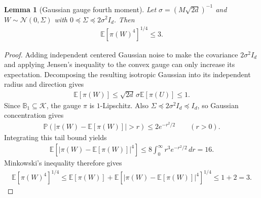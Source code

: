 \documentclass{article}
\newtheorem{lemma}[lemma]{Lemma}
\newcommand{\E}{\mathbb E}
\newcommand{\Pp}{\mathbb P}
\newcommand{\K}{\mathcal K}
\newcommand{\N}{\mathcal N}
\newcommand{\1}{\mathbf 1}
\begin{document}
\begin{lemma}[Gaussian gauge fourth moment]
    \label{lem:gaussian-gauge-fourth-moment}
    Let $\sigma=(M\sqrt{2d})^{-1}$ and $W\sim\N(0,\Sigma)$ with
    $0\preceq\Sigma\preceq2\sigma^2I_d$. Then
    \begin{align}
        \E[\pi(W)^4]^{1/4}\leq3.
    \end{align}
\end{lemma}
\begin{proof}
    Adding independent centered Gaussian noise to make the covariance
    $2\sigma^2I_d$ and applying Jensen's inequality to the convex gauge
    can only increase its expectation. Decomposing the resulting
    isotropic Gaussian into its independent radius and direction gives
    \begin{align}
        \E[\pi(W)]
        \leq\sqrt{2d}\,\sigma\E[\pi(U)]\leq1.
    \end{align}
    Since $\mathbb B_1\subseteq\K$, the gauge $\pi$ is $1$-Lipschitz.
    Also $\Sigma\preceq2\sigma^2I_d\preceq I_d$, so Gaussian
    concentration gives
    \begin{align}
        \Pp\left(|\pi(W)-\E[\pi(W)]|>r\right)
        \leq2e^{-r^2/2}\qquad(r>0).
    \end{align}
    Integrating this tail bound yields
    \begin{align}
        \E\left[|\pi(W)-\E[\pi(W)]|^4\right]
        \leq8\int_0^\infty r^3e^{-r^2/2}\,dr=16.
    \end{align}
    Minkowski's inequality therefore gives
    \begin{align}
        \E[\pi(W)^4]^{1/4}
        \leq\E[\pi(W)]
        +\E\left[|\pi(W)-\E[\pi(W)]|^4\right]^{1/4}
        \leq1+2=3.
    \end{align}
\end{proof}
\end{document}
